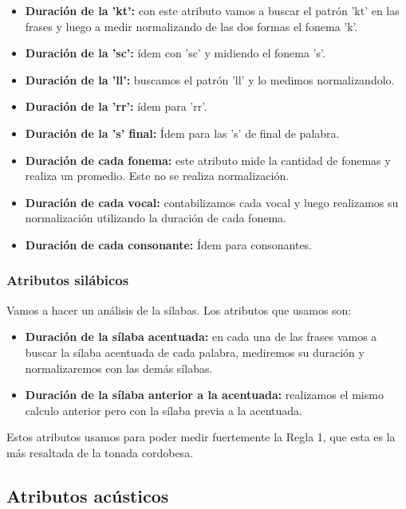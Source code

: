\documentclass[11pt,a4paper,twoside]{tesis}
\begin{document}
\begin{itemize}
    \item \textbf{Duración de la 'kt':} con este atributo vamos a buscar el patrón 'kt' en las frases y luego a medir normalizando de las dos formas el fonema 'k'.  
    \item \textbf{Duración de la 'sc':} ídem con 'sc' y midiendo el fonema 's'.
    \item \textbf{Duración de la 'll':} buscamos el patrón 'll' y lo medimos normalizandolo.
    \item \textbf{Duración de la 'rr':} ídem para 'rr'.
    \item \textbf{Duración de la 's' final:} Ídem para las 's' de final de palabra.
    
    \item \textbf{Duración de cada fonema:} este atributo mide la cantidad de fonemas y realiza un promedio. Este no se realiza normalización.  
    \item \textbf{Duración de cada vocal:} contabilizamos cada vocal y luego realizamos su normalización utilizando la duración de cada fonema.
    \item \textbf{Duración de cada consonante:} Ídem para consonantes. 
\end{itemize}

\subsubsection{Atributos silábicos}

Vamos a hacer un análisis de la sílabas. Los atributos que usamos son:

\begin{itemize}
    \item \textbf{Duración de la sílaba acentuada:} en cada una de las frases vamos a buscar la sílaba acentuada de cada palabra, mediremos su duración y normalizaremos con las demás sílabas.
    \item \textbf{Duración de la sílaba anterior a la acentuada:} realizamos el mismo calculo anterior pero con la sílaba previa a la acentuada. 
\end{itemize}

Estos atributos usamos para poder medir fuertemente la Regla 1, que esta es la más resaltada de la tonada cordobesa. 

\subsection{Atributos acústicos}
\end{document}
